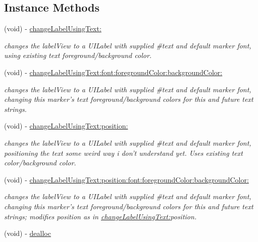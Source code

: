 \subsection*{Instance Methods}
\begin{DoxyCompactItemize}
\item 
(void) -\/ \hyperlink{interface_r_m_marker_a74563af9b6eaf61603636c1202457ecb}{change\-Label\-Using\-Text\-:}
\begin{DoxyCompactList}\small\item\em changes the label\-View to a U\-I\-Label with supplied \#text and default marker font, using existing text foreground/background color. \end{DoxyCompactList}\item 
(void) -\/ \hyperlink{interface_r_m_marker_a5dd4fe76d126bbab97f392aeb9bfb3ec}{change\-Label\-Using\-Text\-:font\-:foreground\-Color\-:background\-Color\-:}
\begin{DoxyCompactList}\small\item\em changes the label\-View to a U\-I\-Label with supplied \#text and default marker font, changing this marker's text foreground/background colors for this and future text strings. \end{DoxyCompactList}\item 
(void) -\/ \hyperlink{interface_r_m_marker_a456cace65c4d3399d7f3909baa4028d5}{change\-Label\-Using\-Text\-:position\-:}
\begin{DoxyCompactList}\small\item\em changes the label\-View to a U\-I\-Label with supplied \#text and default marker font, positioning the text some weird way i don't understand yet. Uses existing text color/background color. \end{DoxyCompactList}\item 
(void) -\/ \hyperlink{interface_r_m_marker_a2de0b0fbed16e70eaa0aeee0d631a3e6}{change\-Label\-Using\-Text\-:position\-:font\-:foreground\-Color\-:background\-Color\-:}
\begin{DoxyCompactList}\small\item\em changes the label\-View to a U\-I\-Label with supplied \#text and default marker font, changing this marker's text foreground/background colors for this and future text strings; modifies position as in \hyperlink{interface_r_m_marker_a74563af9b6eaf61603636c1202457ecb}{change\-Label\-Using\-Text\-:}position. \end{DoxyCompactList}\item 
(void) -\/ \hyperlink{interface_r_m_marker_a9ed3651f45b68ee08af321a7c1d53b30}{dealloc}

\end{DoxyCompactItemize}
